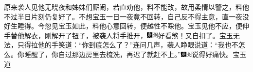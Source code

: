 {原来袭人见他无晓夜和姊妹们厮闹，若直劝他，料不能改，故用柔情以警之，料他不过半日片刻仍复好了。不想宝玉一日一夜竟不回转，自己反不得主意，直一夜没好生睡得。今忽见宝玉如此，料他心意回转，便越性不睬他。宝玉见他不应，便伸手替他解衣，刚解开了钮子，被袭人将手推开，{\includegraphics[width=3mm]{../Images/00004}\includegraphics[width=3mm]{../Images/00011}\footnotesize \kaishu 好看煞！}又自扣了。宝玉无法，只得拉他的手笑道：``你到底怎么了？''连问几声，袭人睁眼说道：``我也不怎么。你睡醒了，你自过那边房里去梳洗，再迟了就赶不上。''{\includegraphics[width=3mm]{../Images/00004}\includegraphics[width=3mm]{../Images/00012}\footnotesize \kaishu 说得好痛快。}宝玉道}
